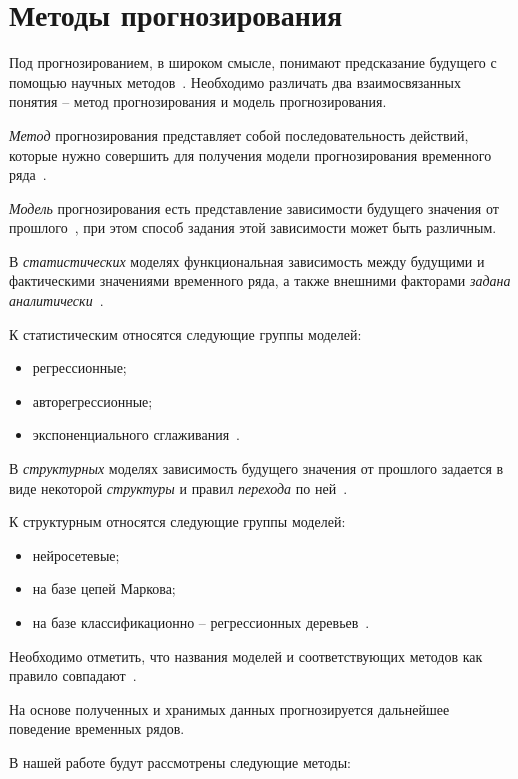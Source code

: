 \chapter{Методы прогнозирования}

Под прогнозированием, в широком смысле, понимают предсказание
будущего с помощью научных методов~\cite{myref9}.
Необходимо различать два взаимосвязанных понятия -- метод прогнозирования и модель прогнозирования.

\textit{Метод} прогнозирования представляет собой последовательность действий, которые нужно совершить для получения модели прогнозирования временного ряда~\cite{myref12}.

\textit{Модель} прогнозирования есть представление зависимости будущего значения от прошлого~\cite{myref9, myref13},
при этом способ задания этой зависимости может быть различным.

В \textit{статистических} моделях функциональная зависимость между
будущими и фактическими значениями временного ряда, а также
внешними факторами \textit{задана аналитически}~\cite{myref9}.

К статистическим относятся следующие группы моделей:

\begin{itemize}
\item регрессионные;
\item авторегрессионные;
\item экспоненциального сглаживания~\cite{myref9}.
\end{itemize}

В \textit{структурных} моделях зависимость будущего значения от прошлого задается в виде некоторой \textit{структуры} и правил \textit{перехода} по ней~\cite{myref9, myref13}.

К структурным относятся следующие группы моделей:

\begin{itemize}
\item нейросетевые;
\item на базе цепей Маркова;
\item на базе классификационно -- регрессионных деревьев~\cite{myref9}.
\end{itemize}

Необходимо отметить, что названия моделей и соответствующих методов как правило совпадают~\cite{myref9}.

На основе полученных и хранимых данных прогнозируется дальнейшее поведение временных рядов.

В нашей работе будут рассмотрены следующие методы:

